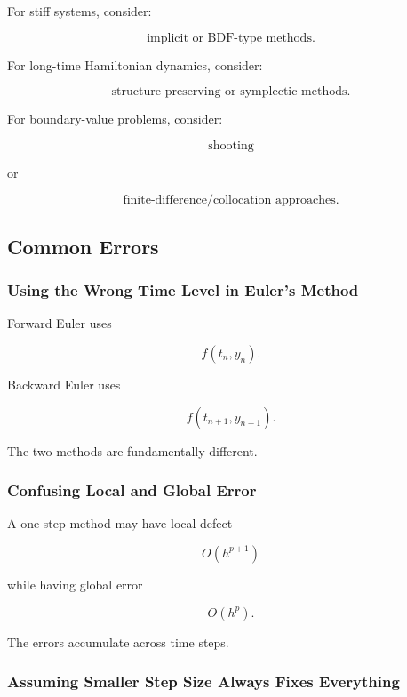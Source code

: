 For stiff systems, consider:

\[
\boxed{
\text{implicit or BDF-type methods}.
}
\]

For long-time Hamiltonian dynamics, consider:

\[
\boxed{
\text{structure-preserving or symplectic methods}.
}
\]

For boundary-value problems, consider:

\[
\boxed{
\text{shooting}
}
\]

or

\[
\boxed{
\text{finite-difference/collocation approaches}.
}
\]

\subsection{Common Errors}
\label{subsec:numerical-ode-common-errors}

\subsubsection{Using the Wrong Time Level in Euler's Method}

Forward Euler uses

\[
\boxed{
f(t_n,y_n).
}
\]

Backward Euler uses

\[
\boxed{
f(t_{n+1},y_{n+1}).
}
\]

The two methods are fundamentally different.

\subsubsection{Confusing Local and Global Error}

A one-step method may have local defect

\[
O(h^{p+1})
\]

while having global error

\[
O(h^p).
\]

The errors accumulate across time steps.

\subsubsection{Assuming Smaller Step Size Always Fixes Everything}

